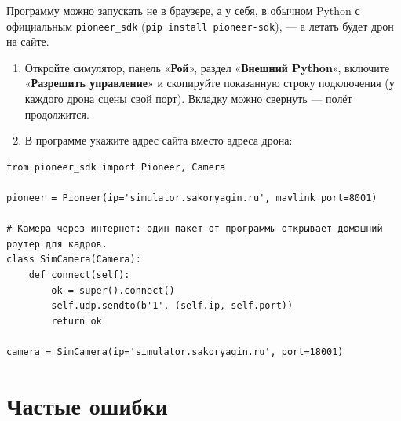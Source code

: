 \documentclass[11pt,a4paper]{article}
\newcommand{\ui}[1]{«\textbf{#1}»}
\begin{document}
Программу можно запускать не в браузере, а у себя, в обычном Python с официальным
\texttt{pioneer\_sdk} (\texttt{pip install pioneer-sdk}), — а летать будет дрон на сайте.

\begin{enumerate}[itemsep=1pt]
    \item Откройте симулятор, панель \ui{Рой}, раздел \ui{Внешний Python}, включите \ui{Разрешить управление} и скопируйте показанную строку подключения (у каждого дрона сцены свой порт).
          Вкладку можно свернуть — полёт продолжится.
    \item В программе укажите адрес сайта вместо адреса дрона:
\end{enumerate}
\begin{lstlisting}[style=py]
from pioneer_sdk import Pioneer, Camera

pioneer = Pioneer(ip='simulator.sakoryagin.ru', mavlink_port=8001)

# Камера через интернет: один пакет от программы открывает домашний роутер для кадров.
class SimCamera(Camera):
    def connect(self):
        ok = super().connect()
        self.udp.sendto(b'1', (self.ip, self.port))
        return ok

camera = SimCamera(ip='simulator.sakoryagin.ru', port=18001)
\end{lstlisting}

\section{Частые ошибки}
\end{document}
